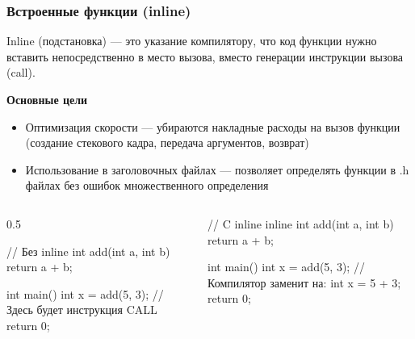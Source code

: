 \documentclass[9pt, aspectratio=1610]{beamer}
\begin{document}
\begin{frame}[fragile]\frametitle{Встроенные функции (inline)}
	
	\begin{alertblock} {Inline (подстановка)  ---}
		это указание компилятору, что код функции нужно вставить непосредственно в место вызова, вместо генерации инструкции вызова (call).
	\end{alertblock}
	
	\textbf{Основные цели}
	
	\begin{itemize}
		\item Оптимизация скорости — убираются накладные расходы на вызов функции (создание стекового кадра, передача аргументов, возврат)
		
		\item Использование в заголовочных файлах — позволяет определять функции в .h файлах без ошибок множественного определения
	\end{itemize}
	
	\begin{columns}[onlytextwidth]
		\edef\colA{0.5}
		\begin{column}{\colA\linewidth}
			\begin{cppcode}
				// Без inline
				int add(int a, int b) {
					return a + b;
				}
				
				int main() {
					int x = add(5, 3);
					// Здесь будет инструкция CALL  
					return 0;
				}
			\end{cppcode}
		\end{column}
		\begin{column}{\fpeval{1-\colA}\linewidth}
			\begin{cppcode}
				// C inline
				inline int add(int a, int b) {
					return a + b;
				}
				
				int main() {
					int x = add(5, 3);
					// Компилятор заменит на: int x = 5 + 3;  
					return 0;
				}
			\end{cppcode}
		\end{column}
	\end{columns}
	
	
	
\end{frame}
\end{document}
